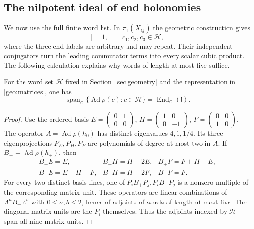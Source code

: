\subsection{The nilpotent ideal of end holonomies}

We now use the full finite word list.  In $\pi_1(X_Q)$ the geometric
construction gives
\begin{equation}
 [z_1^{c_1},[z_2^{c_2},z_3^{c_3}]]=1,
 \qquad c_1,c_2,c_3\in\mathcal H,
 \label{def:relations}
\end{equation}
where the three end labels are arbitrary and may repeat.  Their
independent conjugators turn the leading commutator terms into every
scalar cubic product.  The following calculation explains why words of
length at most five suffice.

\begin{lemma}\label{geo:spanning}
For the word set $\mathcal H$ fixed in Section~\ref{sec:geometry} and
the representation in \eqref{geo:matrices}, one has
\[
 \operatorname{span}_{\mathbb C}
 \{\operatorname{Ad}\rho(c):c\in\mathcal H\}
       =\operatorname{End}_{\mathbb C}(\mathfrak l).
\]
\end{lemma}

\begin{proof}
Use the ordered basis
$E=\left(\begin{smallmatrix}0&1\\0&0\end{smallmatrix}\right)$,
$H=\left(\begin{smallmatrix}1&0\\0&-1\end{smallmatrix}\right)$,
$F=\left(\begin{smallmatrix}0&0\\1&0\end{smallmatrix}\right)$.
The operator $A=\operatorname{Ad}\rho(h_0)$ has distinct eigenvalues
$4,1,1/4$.  Its three eigenprojections $P_E,P_H,P_F$ are polynomials of
degree at most two in $A$.  If $B_\pm=\operatorname{Ad}\rho(h_\pm)$, then
\[
 \begin{array}{lll}
 B_+E=E,&B_+H=H-2E,&B_+F=F+H-E,\\
 B_-E=E-H-F,&B_-H=H+2F,&B_-F=F.
 \end{array}
\]
For every two distinct basis lines, one of
$P_iB_+P_j,P_iB_-P_j$ is a nonzero multiple of the corresponding
matrix unit.  These operators are linear combinations of
$A^aB_\pm A^b$ with $0\leq a,b\leq2$, hence of adjoints of words of
length at most five.  The diagonal matrix units are the $P_i$ themselves.
Thus the adjoints indexed by $\mathcal H$ span all nine matrix units.
\end{proof}

